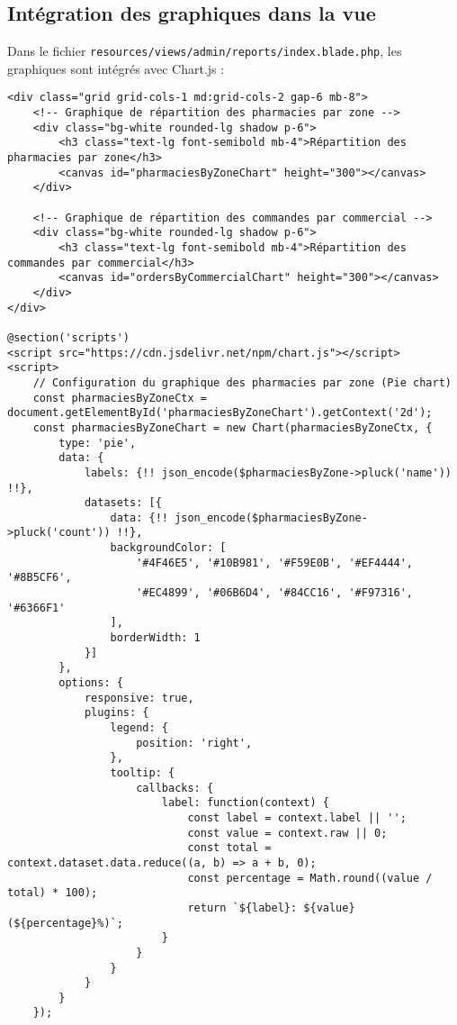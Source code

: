 \documentclass[12pt,a4paper]{article}
\begin{document}
\subsection{Intégration des graphiques dans la vue}
Dans le fichier \texttt{resources/views/admin/reports/index.blade.php}, les graphiques sont intégrés avec Chart.js :

\begin{lstlisting}[caption=Intégration des graphiques avec Chart.js]
<div class="grid grid-cols-1 md:grid-cols-2 gap-6 mb-8">
    <!-- Graphique de répartition des pharmacies par zone -->
    <div class="bg-white rounded-lg shadow p-6">
        <h3 class="text-lg font-semibold mb-4">Répartition des pharmacies par zone</h3>
        <canvas id="pharmaciesByZoneChart" height="300"></canvas>
    </div>
    
    <!-- Graphique de répartition des commandes par commercial -->
    <div class="bg-white rounded-lg shadow p-6">
        <h3 class="text-lg font-semibold mb-4">Répartition des commandes par commercial</h3>
        <canvas id="ordersByCommercialChart" height="300"></canvas>
    </div>
</div>

@section('scripts')
<script src="https://cdn.jsdelivr.net/npm/chart.js"></script>
<script>
    // Configuration du graphique des pharmacies par zone (Pie chart)
    const pharmaciesByZoneCtx = document.getElementById('pharmaciesByZoneChart').getContext('2d');
    const pharmaciesByZoneChart = new Chart(pharmaciesByZoneCtx, {
        type: 'pie',
        data: {
            labels: {!! json_encode($pharmaciesByZone->pluck('name')) !!},
            datasets: [{
                data: {!! json_encode($pharmaciesByZone->pluck('count')) !!},
                backgroundColor: [
                    '#4F46E5', '#10B981', '#F59E0B', '#EF4444', '#8B5CF6',
                    '#EC4899', '#06B6D4', '#84CC16', '#F97316', '#6366F1'
                ],
                borderWidth: 1
            }]
        },
        options: {
            responsive: true,
            plugins: {
                legend: {
                    position: 'right',
                },
                tooltip: {
                    callbacks: {
                        label: function(context) {
                            const label = context.label || '';
                            const value = context.raw || 0;
                            const total = context.dataset.data.reduce((a, b) => a + b, 0);
                            const percentage = Math.round((value / total) * 100);
                            return `${label}: ${value} (${percentage}%)`;
                        }
                    }
                }
            }
        }
    });
    

\end{lstlisting}
\end{document}
